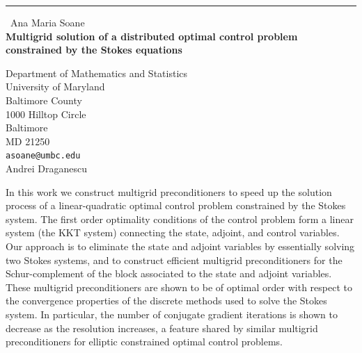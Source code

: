 \documentclass{report}
\begin{document}
\begin{center}
\rule{6in}{1pt} \
{\large Ana Maria Soane \\
{\bf Multigrid solution of a distributed optimal control problem constrained by the Stokes equations }}

Department of Mathematics and Statistics \\ University of Maryland \\ Baltimore County \\ 1000 Hilltop Circle \\ Baltimore \\ MD 21250
\\
{\tt asoane@umbc.edu}\\
Andrei Draganescu\end{center}

In this work we construct multigrid preconditioners to speed up the
solution process of a linear-quadratic optimal control problem
constrained by the Stokes system. The first order optimality conditions
of the control problem form a linear system (the KKT system) connecting
the state, adjoint, and control variables. Our approach is to eliminate
the state and adjoint variables by essentially solving two Stokes
systems, and to construct efficient multigrid preconditioners for the
Schur-complement of the block associated to the state and adjoint
variables. These multigrid preconditioners are shown to be of optimal
order with respect to the convergence properties of the discrete methods
used to solve the Stokes system. In particular, the number of conjugate
gradient iterations is shown to decrease as the resolution increases,
a feature shared by similar multigrid preconditioners for elliptic
constrained optimal control problems.
\end{document}
